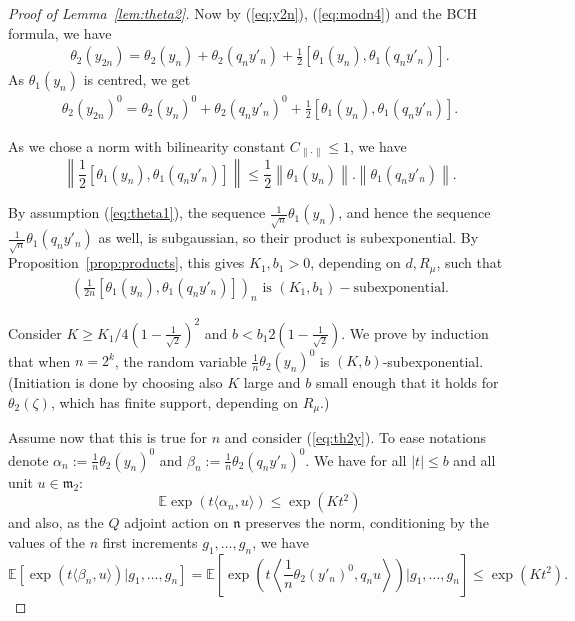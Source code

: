\documentclass[11pt,leqno]{article}
\theoremstyle{plain}
\theoremstyle{definition}
\theoremstyle{remark}
\numberwithin{equation}{section}
\begin{document}
\begin{proof}[Proof of Lemma~\ref{lem:theta2}]
Now by (\ref{eq:y2n}), (\ref{eq:modn4}) and the BCH formula, we have
\begin{align*}
\theta_2(y_{2n})=\theta_2(y_n)+\theta_2(q_ny'_n)+\frac{1}{2}\left[ \theta_1(y_n),\theta_1(q_n y'_n)\right].
\end{align*}
As $\theta_1(y_n)$ is centred, we get
\begin{align}\label{eq:th2y}
\theta_2(y_{2n})^0=\theta_2(y_n)^0+\theta_2(q_ny'_n)^0+\frac{1}{2}\left[ \theta_1(y_n),\theta_1(q_n y'_n)\right].
\end{align}

As we chose a norm with bilinearity constant $C_{\|\cdot\|} \le 1$, we have
\[
\left\|\frac{1}{2}\left[ \theta_1(y_n),\theta_1(q_n y'_n)\right]\right\| \le \frac{1}{2} \left\| \theta_1(y_n)\right\| . \left\| \theta_1(q_ny'_n)\right\|.
\]

By assumption (\ref{eq:theta1}), the sequence $\frac{1}{\sqrt{n}}\theta_1(y_n)$, and hence the sequence $\frac{1}{\sqrt{n}}\theta_1(q_ny'_n)$ as well, is subgaussian, so their product is subexponential. By Proposition~\ref{prop:products}, this gives $K_1,b_1>0$, depending on $d,R_\mu$, such that
\begin{align}\label{eq:K1b1}
\left( \frac{1}{2n}\left[ \theta_1(y_n),\theta_1(q_n y'_n)\right] \right)_n \textrm{ is }(K_1,b_1)-\textrm{subexponential.}
\end{align}

Consider $K\ge K_1/4(1-\frac{1}{\sqrt{2}})^2$ and $b < b_1 2(1-\frac{1}{\sqrt{2}})$. We prove by induction that when $n=2^k$, the random variable $\frac{1}{n} \theta_2(y_n)^0$ is $(K,b)$-subexponential.
(Initiation is done by choosing also $K$ large and $b$ small enough that it holds for $\theta_2(\zeta)$, which has finite support, depending on $R_\mu$.)

Assume now that this is true for $n$ and consider (\ref{eq:th2y}). To ease notations denote $\alpha_n:=\frac{1}{n}\theta_2(y_n)^0$ and $\beta_n:= \frac{1}{n}\theta_2(q_ny'_n)^0$. We have for all $|t|\le b$ and all unit $u \in \mathfrak{m}_{2}$:
\[
\mathbb{E}\exp\left(t \langle \alpha_n ,u\rangle\right) \le \exp(Kt^2)
\]
and also, as the $Q$ adjoint action on $\mathfrak{n}$ preserves the norm, conditioning by the values of the $n$ first increments $g_1,\dots,g_n$, we have
\[
\mathbb{E}\left[\exp\left(t \langle \beta_n ,u\rangle\right)|g_1,\dots,g_n\right]=\mathbb{E}\left[\exp\left(t\left\langle\frac{1}{n}\theta_2(y'_n)^0,q_n u\right\rangle\right)|g_1,\dots,g_n\right] \le \exp(Kt^2).
\]



\end{proof}
\end{document}
